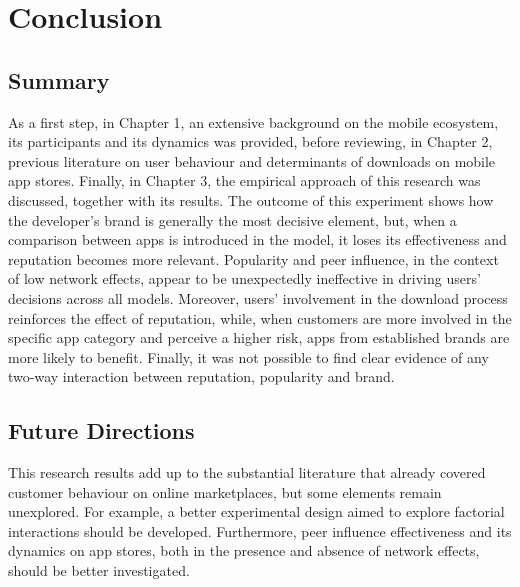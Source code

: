 

\chapter{Conclusion}
\thispagestyle{empty}
\section{Summary}

As a first step, in Chapter 1, an extensive background on the mobile ecosystem, its participants and its dynamics was provided, before reviewing, in Chapter 2, previous literature on user behaviour and determinants of downloads on mobile app stores. Finally, in Chapter 3, the empirical approach of this research was discussed, together with its results. The outcome of this experiment shows how the developer's brand is generally the most decisive element, but, when a comparison between apps is introduced in the model, it loses its effectiveness and reputation becomes more relevant. Popularity and peer influence, in the context of low network effects, appear to be unexpectedly ineffective in driving users' decisions across all models. Moreover, users' involvement in the download process reinforces the effect of reputation, while, when customers are more involved in the specific app category and perceive a higher risk, apps from established brands are more likely to benefit. Finally, it was not possible to find clear evidence of any two-way interaction between reputation, popularity and brand. 


\section{Future Directions}
This research results add up to the substantial literature that already covered customer behaviour on online marketplaces, but some elements remain unexplored. For example, a better experimental design aimed to explore factorial interactions should be developed. Furthermore, peer influence effectiveness and its dynamics on app stores, both in the presence and absence of network effects, should be better investigated.